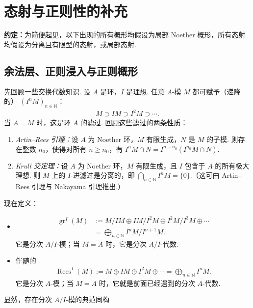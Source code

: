 \chapter{态射与正则性的补充}\label{chap:ag-3}
\setcounter{footnote}{2}
\textbf{约定：}为简便起见，以下出现的所有概形均假设为局部 Noether 概形，所有态射均假设为分离且有限型的态射，或局部态射.
\section{余法层、正则浸入与正则概形}\label{sec:ag-3-1}
\begin{numpara}[$I$-进滤过]\label{item:ag-3-1-1}
先回顾一些交换代数知识. 设 $A$ 是环，$I$ 是理想. 任意 $A$-模 $M$ 都可赋予（递降的） $(I^nM)_{n\in\mathbb N}$：
\begin{align*}
M\supset IM\supset I^2M\supset\cdots.
\end{align*}
当 $A=M$ 时，这是环 $A$ 的滤过. 回顾这些滤过的两条性质：
\begin{enumerate}[label=\roman*)]
\item \emph{Artin--Rees 引理：}设 $A$ 为 Noether 环，$M$ 有限生成，$N$ 是 $M$ 的子模. 则存在整数 $n_0$，使得对所有 $n\ge n_0$，有 $I^nM\cap N=I^{n-n_0}(I^{n_0}M\cap N)$.
\item \emph{Krull 交定理：}设 $A$ 为 Noether 环，$M$ 有限生成，且 $I$ 包含于 $A$ 的所有极大理想. 则 $M$ 上的 $I$-进滤过是分离的，即 $\bigcap_{n\in\mathbb N}I^nM=\{0\}$.（这可由 Artin--Rees 引理与 Nakayama 引理推出.）
\end{enumerate}
现在定义：
\begin{itemize}
\item {}
\begin{align*}
\operatorname{gr}^{I}(M)&:=M/IM\oplus IM/I^2M\oplus I^2M/I^3M\oplus\cdots\\
&=\bigoplus_{n\in\mathbb N}I^nM/I^{n+1}M.
\end{align*}
它是分次 $A/I$-模；当 $M=A$ 时，它是分次 $A/I$-代数.
\item 伴随的
\begin{align*}
\operatorname{Rees}^{I}(M):=M\oplus IM\oplus I^2M\oplus\cdots=\bigoplus_{n\in\mathbb N}I^nM.
\end{align*}
它是分次 $A$-模；当 $M=A$ 时，它就是前面已经遇到的分次 $A$-代数.
\end{itemize}
显然，存在分次 $A/I$-模的典范同构

\end{numpara}
